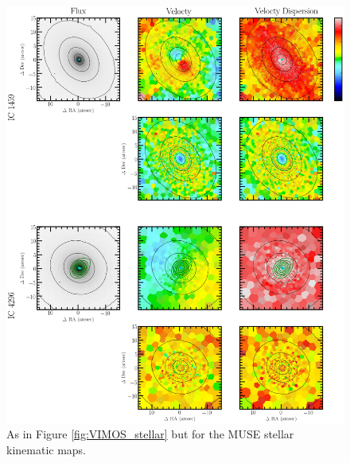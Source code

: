 		\begin{figure}
			\centering
			\includegraphics[height=0.62\textheight]{chapter4/muse/kin1.png}
			\caption[MUSE stellar kinematic maps]{As in Figure \ref{fig:VIMOS_stellar} but for the MUSE stellar kinematic maps.}
			\label{fig:MUSE_stellar}
		\end{figure}
